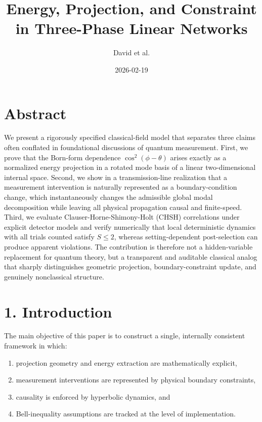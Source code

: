 \documentclass[
  letterpaper,
  DIV=11,
  numbers=noendperiod]{scrartcl}
\title{Energy, Projection, and Constraint in Three-Phase Linear
Networks}
\author{David et al.}
\date{2026-02-19}
\providecommand{\tightlist}{%
  \setlength{\itemsep}{0pt}\setlength{\parskip}{0pt}}
\renewcommand*\contentsname{Table of contents}
\newcommand\contentsname{Table of contents}
\begin{document}
\maketitle

\renewcommand*\contentsname{Table of contents}
{
\hypersetup{linkcolor=}
\setcounter{tocdepth}{3}
\tableofcontents
}

\section{Abstract}\label{abstract}

We present a rigorously specified classical-field model that separates
three claims often conflated in foundational discussions of quantum
measurement. First, we prove that the Born-form dependence
\(\cos^2(\phi-\theta)\) arises exactly as a normalized energy projection
in a rotated mode basis of a linear two-dimensional internal space.
Second, we show in a transmission-line realization that a measurement
intervention is naturally represented as a boundary-condition change,
which instantaneously changes the admissible global modal decomposition
while leaving all physical propagation causal and finite-speed. Third,
we evaluate Clauser-Horne-Shimony-Holt (CHSH) correlations under
explicit detector models and verify numerically that local deterministic
dynamics with all trials counted satisfy \(S\le 2\), whereas
setting-dependent post-selection can produce apparent violations. The
contribution is therefore not a hidden-variable replacement for quantum
theory, but a transparent and auditable classical analog that sharply
distinguishes geometric projection, boundary-constraint update, and
genuinely nonclassical structure.

\section{1. Introduction}\label{introduction}

The main objective of this paper is to construct a single, internally
consistent framework in which:

\begin{enumerate}
\def\labelenumi{\arabic{enumi}.}
\tightlist
\item
  projection geometry and energy extraction are mathematically explicit,
\item
  measurement interventions are represented by physical boundary
  constraints,
\item
  causality is enforced by hyperbolic dynamics, and
\item
  Bell-inequality assumptions are tracked at the level of
  implementation.
\end{enumerate}
\end{document}
